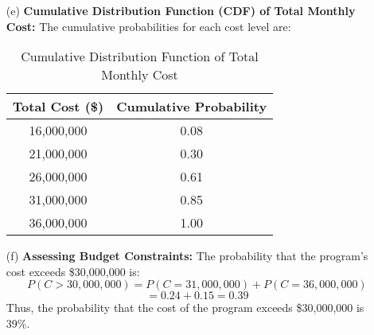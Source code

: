 \documentclass{article}
\begin{document}
\begin{enumerate}
    \item[(e)] \textbf{Cumulative Distribution Function (CDF) of Total Monthly Cost:}
    The cumulative probabilities for each cost level are:

    \begin{table}[H]
    \centering
    \begin{tabular}{c|c}
        \hline
        \textbf{Total Cost (\$)} & \textbf{Cumulative Probability} \\
        \hline
        16,000,000 & 0.08 \\
        21,000,000 & 0.30 \\
        26,000,000 & 0.61 \\
        31,000,000 & 0.85 \\
        36,000,000 & 1.00 \\
        \hline
    \end{tabular}
    \caption{Cumulative Distribution Function of Total Monthly Cost}
    \end{table}

    \item[(f)] \textbf{Assessing Budget Constraints:}
    The probability that the program’s cost exceeds \$30,000,000 is:
    \[
    P(C > 30,000,000) = P(C = 31,000,000) + P(C = 36,000,000)
    \]
    \[
    = 0.24 + 0.15 = 0.39
    \]
    Thus, the probability that the cost of the program exceeds \$30,000,000 is 39\%.

\end{enumerate}
\end{document}
